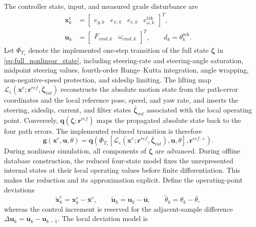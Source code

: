 \documentclass{ieeeaccess}
\begin{document}
The controller state, input, and measured grade disturbance are
\begin{equation}
\begin{aligned}
\bm{x}^{e}_k
&=\begin{bmatrix}e_{y,k}&e_{\psi,k}&e_{v,k}&e_{\omega,k}^{\mathrm{trk}}\end{bmatrix}^{T},\\
\bm{u}_k
&=\begin{bmatrix}F_{cmd,k}&\omega_{cmd,k}\end{bmatrix}^{T},
\qquad d_k=\theta^{\mathrm{sch}}_k .
\end{aligned}
\label{eq:discrete_error_state}
\end{equation}
Let $\Phi_{T_s}$ denote the implemented one-step transition of the full state $\bm\zeta$ in \eqref{eq:full_nonlinear_state}, including steering-rate and steering-angle saturation, midpoint steering values, fourth-order Runge--Kutta integration, angle wrapping, non-negative-speed protection, and sideslip limiting. The lifting map $\mathcal L_e(\bm x^e;\bm r^{ref},\bar{\bm\zeta}_{int})$ reconstructs the absolute motion state from the path-error coordinates and the local reference pose, speed, and yaw rate, and inserts the steering, sideslip, current, and filter states $\bar{\bm\zeta}_{int}$ associated with the local operating point. Conversely, $\bm q(\bm\zeta;\bm r^{ref})$ maps the propagated absolute state back to the four path errors. The implemented reduced transition is therefore
\begin{equation}
\bm g(\bm x^e,\bm u,\theta)
=\bm q\!\left(
\Phi_{T_s}\!\left[
\mathcal L_e(\bm x^e;\bm r^{ref},\bar{\bm\zeta}_{int}),
\bm u,\theta\right],\bm r^{ref,+}
\right).
\label{eq:implemented_error_transition}
\end{equation}
During nonlinear simulation, all components of $\bm\zeta$ are advanced. During offline database construction, the reduced four-state model fixes the unrepresented internal states at their local operating values before finite differentiation. This makes the reduction and its approximation explicit. Define the operating-point deviations
\begin{equation}
\widetilde{\bm x}^{e}_k=\bm x^e_k-\bar{\bm x}^{e},\qquad
\widetilde{\bm u}_k=\bm u_k-\bar{\bm u},\qquad
\widetilde\theta_k=\theta_k-\bar\theta,
\label{eq:operating_point_deviations}
\end{equation}
whereas the control increment is reserved for the adjacent-sample difference $\Delta\bm u_k=\bm u_k-\bm u_{k-1}$. The local deviation model is
\end{document}
